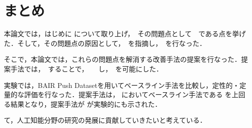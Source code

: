 \chapter{まとめ}
\label{chap:conclusion}

本論文では，はじめに について取り上げ，　その問題点として　である点を挙げた．そして，その問題点の原因として，　を指摘し，　を行なった．


そこで，本論文では，これらの問題点を解消する改善手法の提案を行なった．提案手法では，　することで，　　し，　を可能にした．

実験では，BAIR Push Datasetを用いてベースライン手法を比較し，定性的・定量的な評価を行なった．提案手法は， においてベースライン手法である を上回る結果となり，提案手法が が実験的にも示された．

て，人工知能分野の研究の発展に貢献していきたいと考えている．
